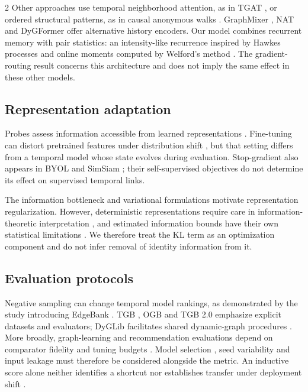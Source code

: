 \documentclass[a4paper,10pt,fleqn]{article}
\begin{document}
\begin{multicols}{2}
Other approaches use temporal neighborhood attention, as in TGAT \cite{tgat}, or ordered structural patterns, as in causal anonymous walks \cite{cawn}. GraphMixer \cite{graphmixer}, NAT \cite{nat} and DyGFormer \cite{dygformer} offer alternative history encoders. Our model combines recurrent memory with pair statistics: an intensity-like recurrence inspired by Hawkes processes \cite{hawkes} and online moments computed by Welford's method \cite{welford}. The gradient-routing result concerns this architecture and does not imply the same effect in these other models.

\subsection{Representation adaptation}
Probes assess information accessible from learned representations \cite{alain}. Fine-tuning can distort pretrained features under distribution shift \cite{kumar}, but that setting differs from a temporal model whose state evolves during evaluation. Stop-gradient also appears in BYOL \cite{byol} and SimSiam \cite{simsiam}; their self-supervised objectives do not determine its effect on supervised temporal links.

The information bottleneck \cite{tishby} and variational formulations \cite{alemi,vae} motivate representation regularization. However, deterministic representations require care in information-theoretic interpretation \cite{ibcrit}, and estimated information bounds have their own statistical limitations \cite{mibounds}. We therefore treat the KL term as an optimization component and do not infer removal of identity information from it.

\subsection{Evaluation protocols}
Negative sampling can change temporal model rankings, as demonstrated by the study introducing EdgeBank \cite{poursafaei}. TGB \cite{tgb}, OGB \cite{ogb} and TGB 2.0 \cite{tgb2} emphasize explicit datasets and evaluators; DyGLib facilitates shared dynamic-graph procedures \cite{dygformer}. More broadly, graph-learning and recommendation evaluations depend on comparator fidelity and tuning budgets \cite{pitfalls,recs}. Model selection \cite{selection}, seed variability \cite{variance} and input leakage \cite{leakage} must therefore be considered alongside the metric. An inductive score alone neither identifies a shortcut \cite{shortcut} nor establishes transfer under deployment shift \cite{underspec}.


\end{multicols}
\end{document}
